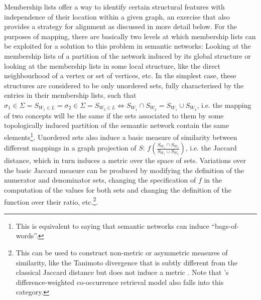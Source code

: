 Membership lists offer a way to identify certain structural features with independence of their location within a given graph, an exercise that also provides a strategy for alignment as discussed in more detail below.
For the purposes of mapping, there are basically two levels at which membership lists can be exploited for a solution to this problem in semantic networks:
Looking at the membership lists of a partition of the network induced by its global structure or looking at the membership lists in some local structure, like the direct neighbourhood of a vertex or set of vertices, etc.
In the simplest case, these structures are considered to be only unordered sets, fully characterised by the entries in their membership lists, such that $\sigma_1 \in \Sigma = S_{W_1 \in L} = \sigma_2 \in \Sigma = S_{W_2 \in L} \Leftrightarrow S_{W_1} \cap S_{W_2} = S_{W_1} \cup S_{W_2}$, i.e. the mapping of two concepts will be the same if the sets associated to them by some topologically induced partition of the semantic network contain the same elements\footnote{
    This is equivalent to saying that semantic networks can induce ``bags-of-words''.
}.
Unordered sets also induce a basic measure of similarity between different mappings in a graph projection of $S$:
$f(\frac{ S_{W_1} \cap S_{W_2} }{ S_{W_1} \cup S_{W_2} })$, i.e. the Jaccard distance, which in turn induces a metric over the space of sets.
Variations over the basic Jaccard measure can be produced by modifying the definition of the numerator and denominator sets, changing the specification of $f$ in the computation of the values for both sets and changing the definition of the function over their ratio, etc.\footnote{
    This can be used to construct non-metric or asymmetric measures of similarity, like the Tanimoto divergence that is subtly different from the classical Jaccard distance but does not induce a metric \citep{salton1968}.
    Note that \citeauthor{weeds2005}'s difference-weighted co-occurrence retrieval model also falls into this category.
}.

